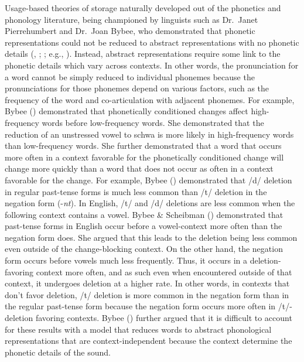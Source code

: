 \documentclass[
  12pt,
  letterpaper,
]{scrreport}
\begin{document}
Usage-based theories of storage naturally developed out of the phonetics
and phonology literature, being championed by linguists such as
Dr.~Janet Pierrehumbert and Dr.~Joan Bybee, who demonstrated that
phonetic representations could not be reduced to abstract
representations with no phonetic details
(,
;
;
e.g.,
). Instead, abstract representations require some link to the
phonetic details which vary across contexts. In other words, the
pronunciation for a word cannot be simply reduced to individual phonemes
because the pronunciations for those phonemes depend on various factors,
such as the frequency of the word and co-articulation with adjacent
phonemes. For example, Bybee
() demonstrated that
phonetically conditioned changes affect high-frequency words before
low-frequency words. She demonstrated that the reduction of an
unstressed vowel to schwa is more likely in high-frequency words than
low-frequency words. She further demonstrated that a word that occurs
more often in a context favorable for the phonetically conditioned
change will change more quickly than a word that does not occur as often
in a context favorable for the change. For example, Bybee
() demonstrated that
/d/ deletion in regular past-tense forms is much less common than /t/
deletion in the negation form (-\emph{nt}). In English, /t/ and /d/
deletions are less common when the following context contains a vowel.
Bybee \& Scheibman ()
demonstrated that past-tense forms in English occur before a
vowel-context more often than the negation form does. She argued that
this leads to the deletion being less common even outside of the
change-blocking context. On the other hand, the negation form occurs
before vowels much less frequently. Thus, it occurs in a
deletion-favoring context more often, and as such even when encountered
outside of that context, it undergoes deletion at a higher rate. In
other words, in contexts that don't favor deletion, /t/ deletion is more
common in the negation form than in the regular past-tense form because
the negation form occurs more often in /t/-deletion favoring contexts.
Bybee () further
argued that it is difficult to account for these results with a model
that reduces words to abstract phonological representations that are
context-independent because the context determine the phonetic details
of the sound.
\end{document}
